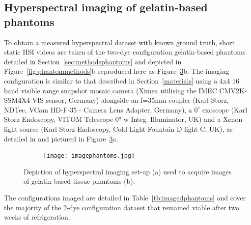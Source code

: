 \subsection{Hyperspectral imaging of gelatin-based phantoms}\label{sec:imagingphantoms}
To obtain a measured hyperspectral dataset with known ground truth, short static HSI videos are taken of the two-dye configuration gelatin-based phantoms detailed in Section~\ref{sec:methodsphantoms} and depicted in Figure~\ref{fig:phantommethods}b reproduced here as Figure~\ref{fig:imagephantoms}b. The imaging configuration is similar to that described in Section~\ref{materials} using a 4x4 16 band visible range snapshot mosaic camera (Ximea utilising the IMEC CMV2K-SSM4X4-VIS sensor, Germany) alongside an f=35mm coupler (Karl Storz, NDTec, VCam HD-F-35 - Camera Lens Adapter, Germany), a $0^\circ$ exoscope (Karl Storz Endoscopy, VITOM Telescope 0° w Integ. Illuminator, UK) and a Xenon light source (Karl Storz Endoscopy, Cold Light Fountain D light C, UK), as detailed in \citet{Ebner2021} and pictured in Figure~\ref{fig:imagephantoms}a.
\begin{figure}[h!]
    \centering
    \begin{subfigure}{0.3\textwidth}
    \centering
        \texttt{[image: imagephantoms.jpg]}
        \caption{}
        \label{fig:imagephantomssetup}
    \end{subfigure}
    \begin{subfigure}{0.6\textwidth}
        \centering
        \caption{}
        \label{fig:phantomsagain}
    \end{subfigure}
    \caption{Depiction of hyperspectral imaging set-up (a) used to acquire images of gelatin-based tissue phantoms (b).}
    \label{fig:imagephantoms}
\end{figure}
The configurations imaged are detailed in Table~\ref{tb:imagedphantoms} and cover the majority of the 2-dye configuration dataset that remained viable after two weeks of refrigeration. 
